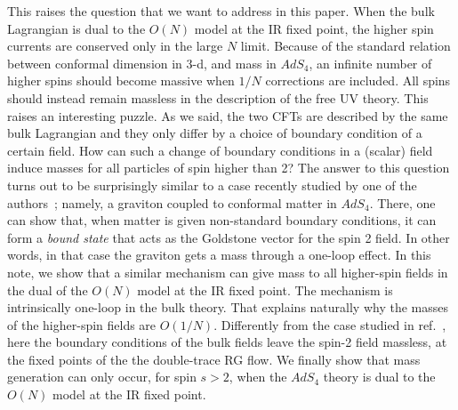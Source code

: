 \documentclass[a4paper,12pt]{article}
\begin{document}
This raises the question that we want to address in this paper.  When
the bulk Lagrangian is dual to the $O(N)$ model at the IR fixed point,
the higher spin currents are conserved only in the large $N$ limit.
Because of the standard relation between conformal dimension in 3-d,
and mass in $AdS_4$, an infinite number of higher spins should become
massive when $1/N$ corrections are included.  All spins should instead
remain massless in the description of the free UV theory. This raises
an interesting puzzle.  As we said, the two CFTs are described by the
same bulk Lagrangian and they only differ by a choice of boundary
condition of a certain field.  How can such a change of boundary
conditions in a (scalar) field induce masses for all particles of spin
higher than 2?  The answer to this question turns out to be
surprisingly similar to a case recently studied by one of the
authors~\cite{porrati}; namely, a graviton coupled to conformal matter
in $AdS_4$. There, one can show that, when matter is given
non-standard boundary conditions, it can form a {\em bound state} that
acts as the Goldstone vector for the spin 2 field.  In other words, in
that case the graviton gets a mass through a one-loop effect.  In this
note, we show that a similar mechanism can give mass to all
higher-spin fields in the dual of the $O(N)$ model at the IR fixed
point.  The mechanism is intrinsically one-loop in the bulk
theory. That explains naturally why the masses of the higher-spin
fields are $O(1/N)$.  Differently from the case studied in
ref.~\cite{porrati}, here the boundary conditions of the bulk fields
leave the spin-2 field massless, at the fixed points of the the
double-trace RG flow.  We finally show that mass generation can only
occur, for spin $s>2$, when the $AdS_4$ theory is dual to the $O(N)$
model at the IR fixed point.
\end{document}
